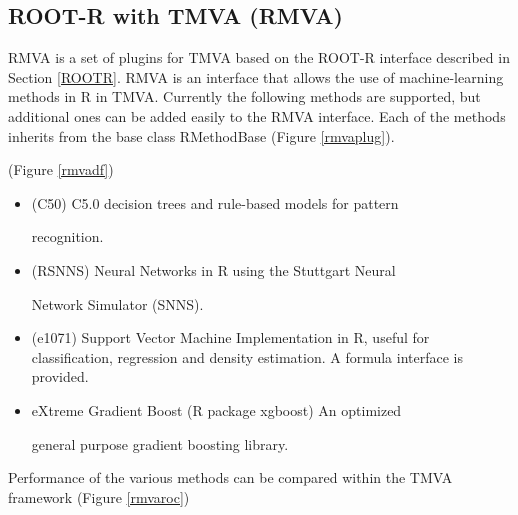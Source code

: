 \documentclass[a4paper]{jpconf}
\begin{document}
\subsection{ROOT-R with TMVA (RMVA)}\label{RMVA}


RMVA is a set of plugins for TMVA based on the ROOT-R interface described in Section \ref{ROOTR}. RMVA is an interface that allows the use of machine-learning methods in R in TMVA. Currently the following methods are supported, but additional ones can be added easily to the RMVA interface. Each of the methods inherits from the base class RMethodBase (Figure \ref{rmvaplug}).


(Figure \ref{rmvadf}) 

\begin{itemize}  

\item (C50) C5.0 decision trees and rule-based models for pattern

recognition\cite{c50}.

\item (RSNNS) Neural Networks in R using the Stuttgart Neural

Network Simulator (SNNS)\cite{rsnns}.

\item (e1071) Support Vector Machine Implementation in R, useful for classification, regression and density estimation. A formula interface is provided\cite{e1071}.

\item eXtreme Gradient Boost (R package xgboost) An optimized

general purpose gradient boosting library\cite{chen2015xgboost}.

\end{itemize}



Performance of the various methods can be compared within the TMVA framework (Figure \ref{rmvaroc})
\end{document}
